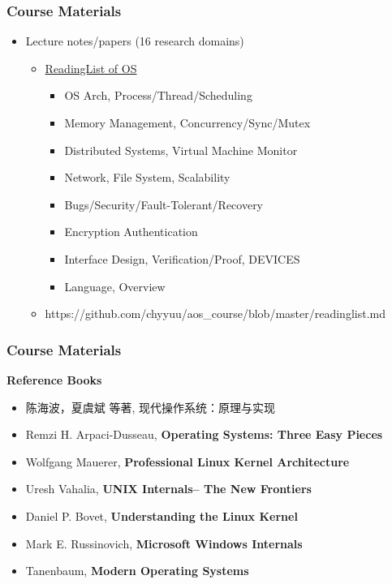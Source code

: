 \begin{frame}[plain]	
	\frametitle{Course Materials}
	
	\begin{itemize}\Large 
		\item Lecture notes/papers (16 research domains)
		
		\begin{itemize}\large 
			\item  \href{https://github.com/chyyuu/aos\_course/blob/master/readinglist.md}{ReadingList of OS}
			\begin{itemize}\large 
				\item OS Arch,  Process/Thread/Scheduling
				\item Memory Management, Concurrency/Sync/Mutex
				\item Distributed Systems, Virtual Machine Monitor
				\item Network, File System, Scalability
				\item Bugs/Security/Fault-Tolerant/Recovery
				\item Encryption Authentication
				\item Interface Design, Verification/Proof, DEVICES
				\item Language, Overview
			\end{itemize}
			\item  https://github.com/chyyuu/aos\_course/blob/master/readinglist.md
		\end{itemize}
	\end{itemize}
	
	
\end{frame}

\begin{frame}[plain]	
	\frametitle{Course Materials}
	\Large 
	\textbf{Reference Books}
	\begin{itemize}\large 
        \item 陈海波，夏虞斌 等著, 现代操作系统：原理与实现
        \item Remzi H. Arpaci-Dusseau, \textbf{Operating Systems: Three Easy Pieces}
		\item Wolfgang Mauerer, \textbf{Professional Linux Kernel Architecture}
		\item Uresh Vahalia, \textbf{UNIX Internals-- The New Frontiers}
		\item Daniel P. Bovet, \textbf{Understanding the Linux Kernel}
		\item Mark E. Russinovich,\textbf{ Microsoft Windows Internals}
		\item Tanenbaum, \textbf{Modern Operating Systems}

	\end{itemize}
	
\end{frame}



